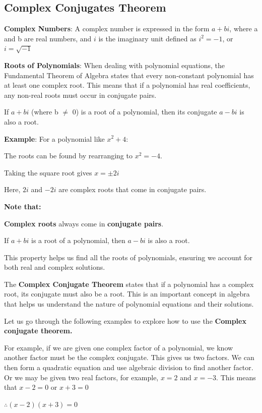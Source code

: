 \subsection{Complex Conjugates Theorem}

\textbf{Complex Numbers}: A complex number is expressed in the form $a + bi$, where a
and b are real numbers, and $i$ is the imaginary unit defined as $i^2 = -1$, or
$i = \sqrt{-1}$

\textbf{Roots of Polynomials}: When dealing with polynomial equations, the Fundamental
Theorem of Algebra states that every non-constant polynomial has at least one
complex root. This means that if a polynomial has real coefficients, any non-real
roots must occur in conjugate pairs.

If $a + bi$ (where b $\ne$ 0) is a root of a polynomial, then its conjugate $a - bi$ is
also a root.

\textbf{Example}: For a polynomial like $x^2 + 4$:

The roots can be found by rearranging to $x^2 = -4$.

Taking the square root gives $x = \pm 2i$

Here, $2i$ and $-2i$ are complex roots that come in conjugate pairs.

\textbf{Note that:}

\textbf{Complex roots} always come in \textbf{conjugate pairs}.

If $a + bi$ is a root of a polynomial, then $a - bi$ is also a root.

This property helps us find all the roots of polynomials, ensuring we account for
both real and complex solutions.

The \textbf{Complex Conjugate Theorem} states that if a polynomial has a complex
root, its conjugate must also be a root. This is an important concept in algebra that
helps us understand the nature of polynomial equations and their solutions.

Let us go through the following examples to explore how to use the \textbf{Complex
conjugate theorem.}

For example, if we are given one complex factor of a polynomial, we know
another factor must be the complex conjugate. This gives us two factors. We can
then form a quadratic equation and use algebraic division to find another factor.
Or we may be given two real factors, for example, $x = 2$ and $x = -3$. This means
that $x - 2 = 0$ or $x + 3 = 0$

$\therefore (x - 2)(x + 3) = 0$

